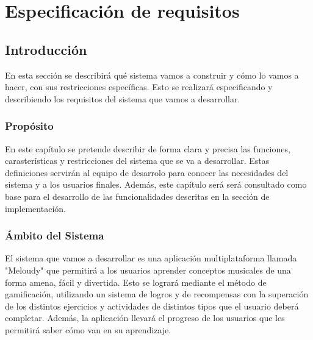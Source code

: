 \chapter{Especificación de requisitos}


\section{Introducción}
En esta sección se describirá qué sistema vamos a construir y cómo lo vamos a hacer, 
con sus restricciones específicas. Esto se realizará especificando y describiendo
 los requisitos del sistema que vamos a desarrollar. 

\subsection{Propósito}
En este capítulo se pretende describir de forma clara y precisa las funciones, carasterísticas y restricciones
del sistema que se va a desarrollar. Estas definiciones servirán al equipo de desarrolo para
conocer las necesidades del sistema y a los usuarios finales. Además, este capítulo será será consultado como
base para el desarrollo de las funcionalidades descritas en la sección de implementación.

\subsection{Ámbito del Sistema}
El sistema que vamos a desarrollar es una aplicación multiplataforma llamada "Meloudy" que permitirá a los usuarios
aprender conceptos musicales de una forma amena, fácil y divertida. Esto se logrará mediante el método de gamificación,
utilizando un sistema de logros y de recompensas con la superación de los distintos ejercicios y actividades de distintos tipos que el usuario deberá completar.
Además, la aplicación llevará el progreso de los usuarios que les permitirá saber cómo van en su aprendizaje.

